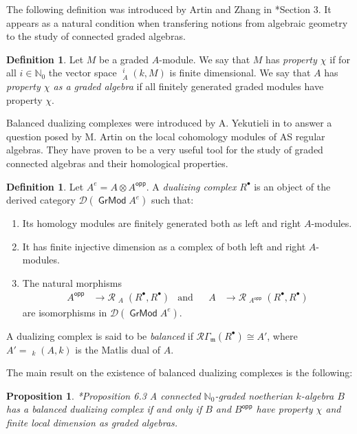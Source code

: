 \documentclass[11pt,fleqn]{article}
\theoremstyle{plain}
\newtheorem{Proposition}[Theorem]{Proposition}
\theoremstyle{remark}
\theoremstyle{definition}
\newtheorem{Definition}[Theorem]{Definition}
\newcommand\NN{\mathbb N}
\newcommand\ot{\otimes}
\renewcommand\to{\longrightarrow}
\newcommand\D{\mathcal D}
\newcommand\GG{\Gamma}
\newcommand\R{\mathcal R}
\newcommand\m{\mathfrak m}
\newcommand\opp{\mathsf{opp}}
\DeclareMathOperator\Gr{\mathsf{GrMod}}
\DeclareMathOperator\GrHom{\underline{\mathsf{Hom}}}
\DeclareMathOperator\GrExt{\underline{\mathsf{Ext}}}
\begin{document}
The following definition was introduced by Artin and Zhang in \cite{AZ}*{Section 3}.
It appears as a natural condition when transfering notions from algebraic
geometry to the study of connected graded algebras.

\begin{Definition}
Let $M$ be a graded $A$-module. We say that $M$ has \emph{property $\chi$} if for all $i
\in \NN_0$ the vector space $\GrExt_A^i(k,M)$ is finite dimensional. We say that $A$ has
\emph{property $\chi$ as a graded algebra} if all finitely generated graded modules have
property $\chi$.
\end{Definition}
	
Balanced dualizing complexes were introduced by A. Yekutieli in \cite{Ye} to answer a
question posed by M. Artin on the local cohomology modules of AS regular algebras. They
have proven to be a very useful tool for the study of graded connected algebras and their
homological properties.
\begin{Definition}
	Let $A^e = A \ot A^{\opp}$. A \emph{dualizing complex} $R^\bullet$ is
	an object of the derived category $\D(\Gr A^e)$ such that:
	\begin{enumerate}
		\item Its homology modules are finitely generated both as left and right
			$A$-modules.
		\item It has finite injective dimension as a complex of both left and
			right $A$-modules.
		\item The natural morphisms
		\begin{align*}
			A^\opp &\to \R\GrHom_A(R^\bullet, R^\bullet) & \mbox{and}&&  A
			&\to \R\GrHom_{A^\opp}(R^\bullet, R^\bullet)
		\end{align*}
	are isomorphisms in $\D(\Gr A^e)$.
	\end{enumerate}
	A dualizing complex is said to be \emph{balanced} if $\R\GG_\m(R^\bullet) \cong
	A'$, where $A' = \GrHom_k(A,k)$ is the Matlis dual of $A$.
\end{Definition}

The main result on the existence of balanced dualizing complexes is the following:

\begin{Proposition}\cite{vdB}*{Proposition 6.3}
\label{vdb-criterion}
  A connected $\NN_0$-graded noetherian $k$-algebra $B$ has a balanced dualizing complex
  if and only if $B$ and $B^\opp$ have property $\chi$ and finite local dimension as
  graded algebras.
\end{Proposition}
\end{document}

